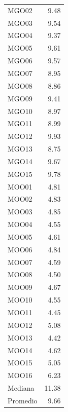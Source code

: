 \begin{longtable}{lr}
MGO02 & 9.48 \\
MGO03 & 9.54 \\
MGO04 & 9.37 \\
MGO05 & 9.61 \\
MGO06 & 9.57 \\
MGO07 & 8.95 \\
MGO08 & 8.86 \\
MGO09 & 9.41 \\
MGO10 & 8.97 \\
MGO11 & 8.99 \\
MGO12 & 9.93 \\
MGO13 & 8.75 \\
MGO14 & 9.67 \\
MGO15 & 9.78 \\
\midrule
MOO01 & 4.81 \\
MOO02 & 4.83 \\
MOO03 & 4.85 \\
MOO04 & 4.55 \\
MOO05 & 4.61 \\
MOO06 & 4.84 \\
MOO07 & 4.59 \\
MOO08 & 4.50 \\
MOO09 & 4.67 \\
MOO10 & 4.55 \\
MOO11 & 4.45 \\
MOO12 & 5.08 \\
MOO13 & 4.42 \\
MOO14 & 4.62 \\
MOO15 & 5.05 \\
MOO16 & 6.23 \\
\midrule
Mediana & 11.38 \\
Promedio   & 9.66 \\
\end{longtable}
